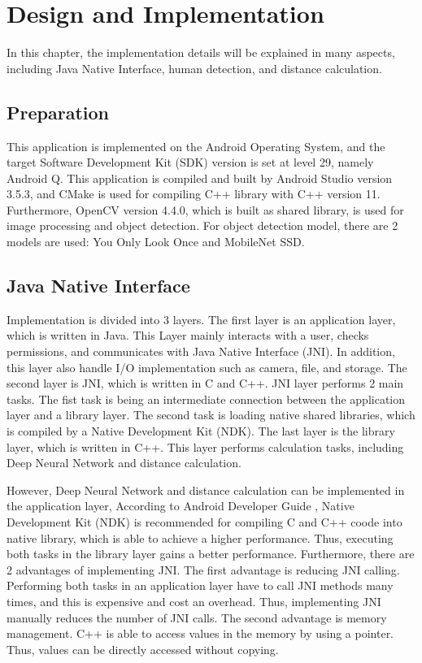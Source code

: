 \chapter{Design and Implementation}\label{implement}

    In this chapter, the implementation details will be explained in many aspects, including Java Native Interface,
    human detection, and distance calculation.

    \section{Preparation}
        This application is implemented on the Android Operating System,
        and the target Software Development Kit (SDK) version is set at level 29, namely Android Q.
        This application is compiled and built by Android Studio version 3.5.3,
        and CMake is used for compiling C++ library with C++ version 11.
        Furthermore, OpenCV version 4.4.0, which is built as shared library, is used for image processing and object detection.
        For object detection model, there are 2 models are used: You Only Look Once and MobileNet SSD.

    \section{Java Native Interface}
        Implementation is divided into 3 layers.
            The first layer is an application layer, which is written in Java.
                This Layer mainly interacts with a user, checks permissions, and communicates with Java Native Interface (JNI).
                In addition, this layer also handle I/O implementation such as camera, file, and storage.
            The second layer is JNI, which is written in C and C++.
                JNI layer performs 2 main tasks.
                    The fist task is being an intermediate connection between the application layer and a library layer.
                    The second task is loading native shared libraries, which is compiled by a Native Development Kit (NDK).
            The last layer is the library layer, which is written in C++.
                This layer performs calculation tasks, including Deep Neural Network and distance calculation.

        However, Deep Neural Network and distance calculation can be implemented in the application layer,
        According to Android Developer Guide \cite{ANDROID-01},
        Native Development Kit (NDK) is recommended for compiling C and C++ coode into native library,
        which is able to achieve a higher performance.
        Thus, executing both tasks in the library layer gains a better performance.
        Furthermore, there are 2 advantages of implementing JNI.
            The first advantage is reducing JNI calling. Performing both tasks in an application layer have to call JNI methods many times,
                and this is expensive and cost an overhead.
                Thus, implementing JNI manually reduces the number of JNI calls.
            The second advantage is memory management. C++ is able to access values in the memory by using a pointer.
                Thus, values can be directly accessed without copying.

